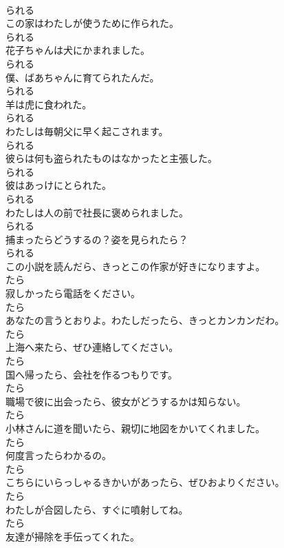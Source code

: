 \documentclass[8pt]{extreport}
\begin{document}
\begin{CJK}{UTF8}{min}
\\	られる	
\\	この家はわたしが使うために作られた。	
\\	られる	
\\	花子ちゃんは犬にかまれました。	
\\	られる	
\\	僕、ばあちゃんに育てられたんだ。	
\\	られる	
\\	羊は虎に食われた。	
\\	られる	
\\	わたしは毎朝父に早く起こされます。	
\\	られる	
\\	彼らは何も盗られたものはなかったと主張した。	
\\	られる	
\\	彼はあっけにとられた。	
\\	られる	
\\	わたしは人の前で社長に褒められました。	
\\	られる	
\\	捕まったらどうするの？姿を見られたら？	
\\	られる	
\\	この小説を読んだら、きっとこの作家が好きになりますよ。	
\\	たら	
\\	寂しかったら電話をください。	
\\	たら	
\\	あなたの言うとおりよ。わたしだったら、きっとカンカンだわ。	
\\	たら	
\\	上海へ来たら、ぜひ連絡してください。	
\\	たら	
\\	国へ帰ったら、会社を作るつもりです。	
\\	たら	
\\	職場で彼に出会ったら、彼女がどうするかは知らない。	
\\	たら	
\\	小林さんに道を聞いたら、親切に地図をかいてくれました。	
\\	たら	
\\	何度言ったらわかるの。	
\\	たら	
\\	こちらにいらっしゃるきかいがあったら、ぜひおよりください。	
\\	たら	
\\	わたしが合図したら、すぐに噴射してね。	
\\	たら	
\\	友達が掃除を手伝ってくれた。	

\end{CJK}
\end{document}
